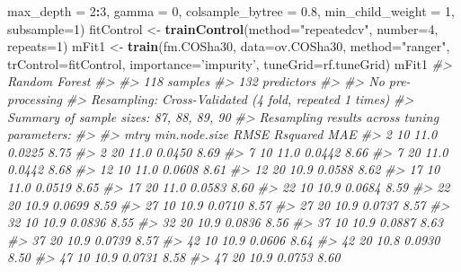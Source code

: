 \documentclass[graybox,natbib,nospthms,UStrade]{svmono}
\newenvironment{Shaded}{\begin{snugshade}}{\end{snugshade}}
\newcommand{\CommentTok}[1]{\textcolor[rgb]{0.37,0.37,0.37}{\textit{#1}}}
\newcommand{\DataTypeTok}[1]{\textcolor[rgb]{0.27,0.27,0.27}{#1}}
\newcommand{\DecValTok}[1]{\textcolor[rgb]{0.06,0.06,0.06}{#1}}
\newcommand{\FloatTok}[1]{\textcolor[rgb]{0.06,0.06,0.06}{#1}}
\newcommand{\KeywordTok}[1]{\textcolor[rgb]{0.27,0.27,0.27}{\textbf{#1}}}
\newcommand{\NormalTok}[1]{#1}
\newcommand{\OperatorTok}[1]{\textcolor[rgb]{0.43,0.43,0.43}{\textbf{#1}}}
\newcommand{\StringTok}[1]{\textcolor[rgb]{0.5,0.5,0.5}{#1}}
\begin{document}
\begin{Shaded}
\begin{Highlighting}[]
                           \DataTypeTok{max_depth =} \DecValTok{2}\OperatorTok{:}\DecValTok{3}\NormalTok{, }\DataTypeTok{gamma =} \DecValTok{0}\NormalTok{, }
                           \DataTypeTok{colsample_bytree =} \FloatTok{0.8}\NormalTok{, }
                           \DataTypeTok{min_child_weight =} \DecValTok{1}\NormalTok{, }\DataTypeTok{subsample=}\DecValTok{1}\NormalTok{)}
\NormalTok{fitControl <-}\StringTok{ }\KeywordTok{trainControl}\NormalTok{(}\DataTypeTok{method=}\StringTok{"repeatedcv"}\NormalTok{, }\DataTypeTok{number=}\DecValTok{4}\NormalTok{, }\DataTypeTok{repeats=}\DecValTok{1}\NormalTok{)}
\NormalTok{mFit1 <-}\StringTok{ }\KeywordTok{train}\NormalTok{(fm.COSha30, }\DataTypeTok{data=}\NormalTok{ov.COSha30, }\DataTypeTok{method=}\StringTok{"ranger"}\NormalTok{, }
               \DataTypeTok{trControl=}\NormalTok{fitControl, }\DataTypeTok{importance=}\StringTok{'impurity'}\NormalTok{, }
               \DataTypeTok{tuneGrid=}\NormalTok{rf.tuneGrid)}
\NormalTok{mFit1}
\CommentTok{#> Random Forest }
\CommentTok{#> }
\CommentTok{#> 118 samples}
\CommentTok{#> 132 predictors}
\CommentTok{#> }
\CommentTok{#> No pre-processing}
\CommentTok{#> Resampling: Cross-Validated (4 fold, repeated 1 times) }
\CommentTok{#> Summary of sample sizes: 87, 88, 89, 90 }
\CommentTok{#> Resampling results across tuning parameters:}
\CommentTok{#> }
\CommentTok{#>   mtry  min.node.size  RMSE  Rsquared  MAE }
\CommentTok{#>    2    10             11.0  0.0225    8.75}
\CommentTok{#>    2    20             11.0  0.0450    8.69}
\CommentTok{#>    7    10             11.0  0.0442    8.66}
\CommentTok{#>    7    20             11.0  0.0442    8.68}
\CommentTok{#>   12    10             11.0  0.0608    8.61}
\CommentTok{#>   12    20             10.9  0.0588    8.62}
\CommentTok{#>   17    10             11.0  0.0519    8.65}
\CommentTok{#>   17    20             11.0  0.0583    8.60}
\CommentTok{#>   22    10             10.9  0.0684    8.59}
\CommentTok{#>   22    20             10.9  0.0699    8.59}
\CommentTok{#>   27    10             10.9  0.0710    8.57}
\CommentTok{#>   27    20             10.9  0.0737    8.57}
\CommentTok{#>   32    10             10.9  0.0836    8.55}
\CommentTok{#>   32    20             10.9  0.0836    8.56}
\CommentTok{#>   37    10             10.9  0.0887    8.63}
\CommentTok{#>   37    20             10.9  0.0739    8.57}
\CommentTok{#>   42    10             10.9  0.0606    8.64}
\CommentTok{#>   42    20             10.8  0.0930    8.50}
\CommentTok{#>   47    10             10.9  0.0731    8.58}
\CommentTok{#>   47    20             10.9  0.0753    8.60}

\end{Highlighting}
\end{Shaded}
\end{document}
